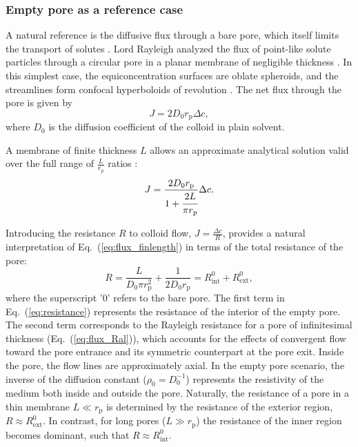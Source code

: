 \documentclass[12pt, a4paper]{article}
\begin{document}
\subsubsection{Empty pore as a reference case}

A natural reference is the diffusive flux through a bare pore, which itself limits the transport of solutes \cite{Deen1987, Sun2024}.
Lord Rayleigh analyzed the flux of point-like solute particles through a circular pore in a planar membrane of negligible thickness \cite{Strutt1878}.
In this simplest case, the equiconcentration surfaces are oblate spheroids, and the streamlines form confocal hyperboloids of revolution \cite{Cooke1966}.
The net flux through the pore is given by
\begin{equation}
    J=2D_0r_{\text{p}}\Delta c,
    \label{eq:flux_Ral}
\end{equation}
where $D_0$ is the diffusion coefficient of the colloid in plain solvent.

A membrane of finite thickness $L$ allows an approximate analytical solution valid over the full range of $\frac{L}{r_{\text{p}}}$ ratios \cite{Brunn1984}:
\begin{equation}
    J=\frac{2 D_0 r_{\text{p}}}{1+\cfrac{2L}{\pi r_{\text{p}}}}\Delta c.
    \label{eq:flux_finlength}
\end{equation}

Introducing the resistance $R$ to colloid flow, $J = \frac{\Delta c}{R}$, provides a natural interpretation of Eq.~(\ref{eq:flux_finlength}) in terms of the total resistance of the pore:
\begin{equation}
    R = \frac{L}{D_0 \pi r_{\text{p}}^{2}} + \frac{1}{2 D_0 r_{\text{p}}} = R_{\text{int}}^{0} + R_{\text{ext}}^{0},
    \label{eq:resistance}
\end{equation}
where the superscript '0' refers to the bare pore.
The first term in Eq.~(\ref{eq:resistance}) represents the resistance of the interior of the empty pore.
The second term corresponds to the Rayleigh resistance for a pore of infinitesimal thickness (Eq.~(\ref{eq:flux_Ral})), which accounts for the effects of convergent flow toward the pore entrance and its symmetric counterpart at the pore exit.
Inside the pore, the flow lines are approximately axial.
In the empty pore scenario, the inverse of the diffusion constant ($\rho_0=D_0^{-1}$) represents the resistivity of the medium both inside and outside the pore.
Naturally,  the resistance of a pore in a thin membrane $L \ll r_{\text{p}}$ is determined by the resistance of the exterior region, $R \approx R_{\text{ext}}^{0}$.
In contrast, for long pores ($L \gg r_{\text{p}}$) the resistance of the inner region becomes dominant, such that $R \approx R_{\text{int}}^{0}$.
\end{document}
